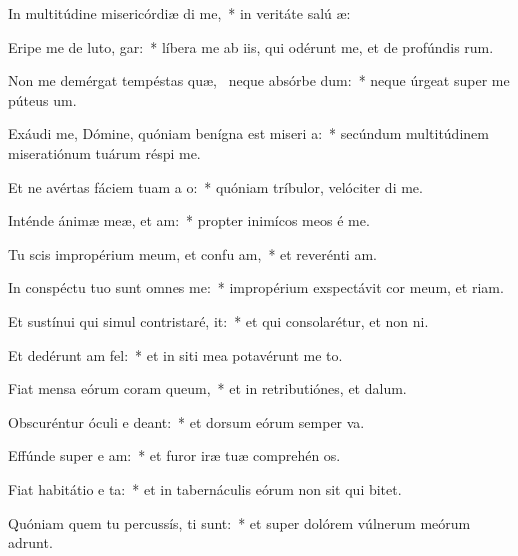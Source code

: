 \item In multitúdine misericórdiæ  di me,~* in veritáte salú æ:
\item Eripe me de luto,   gar:~* líbera me ab iis, qui odérunt me, et de profúndis rum.
\item Non me demérgat tempéstas quæ,~\pscross{} neque absórbe  dum:~* neque úrgeat super me púteus  um.
\item Exáudi me, Dómine, quóniam benígna est miseri a:~* secúndum multitúdinem miseratiónum tuárum réspi  me.
\item Et ne avértas fáciem tuam a  o:~* quóniam tríbulor, velóciter di me.
\item Inténde ánimæ meæ, et  am:~* propter inimícos meos é me.
\item Tu scis impropérium meum, et confu am,~* et reverénti am.
\item In conspéctu tuo sunt omnes   me:~* impropérium exspectávit cor meum, et riam.
\item Et sustínui qui simul contristaré,   it:~* et qui consolarétur, et non ni.
\item Et dedérunt   am fel:~* et in siti mea potavérunt me to.
\item Fiat mensa eórum coram   queum,~* et in retributiónes, et  dalum.
\item Obscuréntur óculi e  deant:~* et dorsum eórum semper va.
\item Effúnde super e  am:~* et furor iræ tuæ comprehén os.
\item Fiat habitátio e ta:~* et in tabernáculis eórum non sit qui bitet.
\item Quóniam quem tu percussís, ti sunt:~* et super dolórem vúlnerum meórum adrunt.
